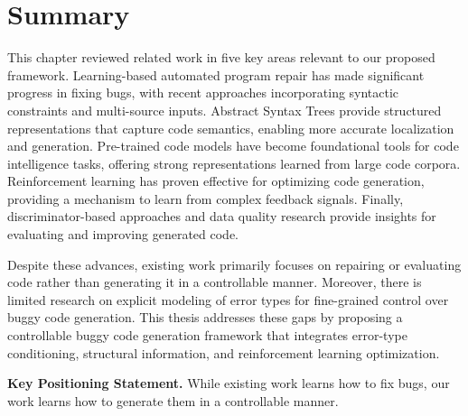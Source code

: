 \section{Summary}

This chapter reviewed related work in five key areas relevant to our proposed framework. Learning-based automated program repair has made significant progress in fixing bugs, with recent approaches incorporating syntactic constraints and multi-source inputs. Abstract Syntax Trees provide structured representations that capture code semantics, enabling more accurate localization and generation. Pre-trained code models have become foundational tools for code intelligence tasks, offering strong representations learned from large code corpora. Reinforcement learning has proven effective for optimizing code generation, providing a mechanism to learn from complex feedback signals. Finally, discriminator-based approaches and data quality research provide insights for evaluating and improving generated code.

Despite these advances, existing work primarily focuses on repairing or evaluating code rather than generating it in a controllable manner. Moreover, there is limited research on explicit modeling of error types for fine-grained control over buggy code generation. This thesis addresses these gaps by proposing a controllable buggy code generation framework that integrates error-type conditioning, structural information, and reinforcement learning optimization.

\begingroup
\vspace{1em}
\textbf{Key Positioning Statement.} While existing work learns how to fix bugs, our work learns how to generate them in a controllable manner.
\endgroup

\endgroup
\endinput
